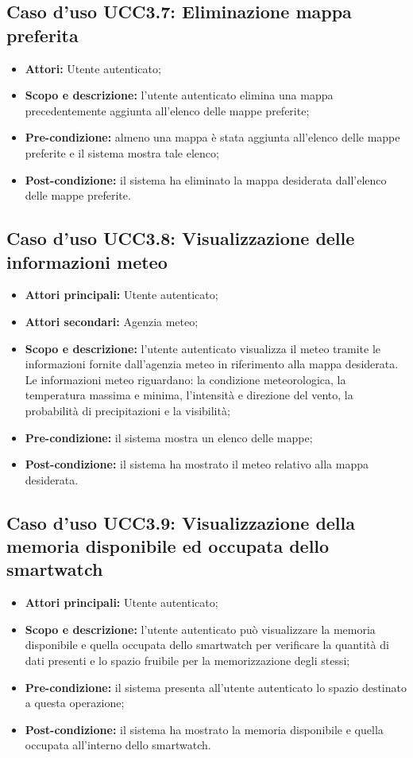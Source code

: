\subsection{Caso d'uso UCC3.7: Eliminazione mappa preferita}

\begin{itemize}
\item \textbf{Attori:} Utente autenticato;
\item \textbf{Scopo e descrizione:} l'utente autenticato elimina una mappa precedentemente aggiunta all'elenco delle mappe preferite;
\item \textbf{Pre-condizione:} almeno una mappa è stata aggiunta all'elenco delle mappe preferite e il sistema mostra tale elenco;
\item \textbf{Post-condizione:} il sistema ha eliminato la mappa desiderata dall'elenco delle mappe preferite.
\end{itemize}

\subsection{Caso d'uso UCC3.8: Visualizzazione delle informazioni meteo}

\begin{itemize}
\item \textbf{Attori principali:} Utente autenticato;
\item \textbf{Attori secondari:} Agenzia meteo;
\item \textbf{Scopo e descrizione:} l'utente autenticato visualizza il meteo tramite le informazioni fornite dall'agenzia meteo in riferimento alla mappa desiderata. Le informazioni meteo riguardano: la condizione meteorologica, la temperatura massima e minima, l'intensità e direzione del vento, la probabilità di precipitazioni e la visibilità;
\item \textbf{Pre-condizione:} il sistema mostra un elenco delle mappe;
\item \textbf{Post-condizione:} il sistema ha mostrato il meteo relativo alla mappa desiderata. 
\end{itemize}

\subsection{Caso d'uso UCC3.9: Visualizzazione della memoria disponibile ed occupata dello smartwatch}
\begin{itemize}
\item \textbf{Attori principali:} Utente autenticato;
\item \textbf{Scopo e descrizione:} l'utente autenticato può visualizzare la memoria disponibile e quella occupata dello smartwatch per verificare la quantità di dati presenti e lo spazio fruibile per la memorizzazione degli stessi;
\item \textbf{Pre-condizione:} il sistema presenta all'utente autenticato lo spazio destinato a questa operazione;
\item \textbf{Post-condizione:} il sistema ha mostrato la memoria disponibile e quella occupata all'interno dello smartwatch. 
\end{itemize}


